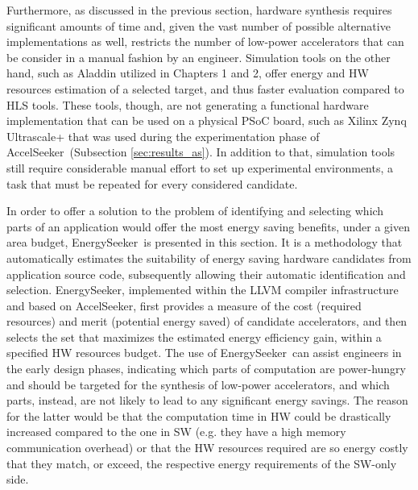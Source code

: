 \documentclass[]{usiinfthesis}
\newcommand{\aseeker}{{AccelSeeker}}
\newcommand{\eseeker}{{EnergySeeker}}
\begin{document}
Furthermore, as discussed in the previous section, hardware
synthesis requires significant amounts of time and, given 
the vast number of possible alternative implementations as well, restricts
the number of low-power accelerators that can be consider in a 
manual fashion by an engineer.
Simulation tools on the other hand, such as Aladdin \cite{ShaoJul14} utilized in Chapters 1 and 2, 
offer energy and HW resources estimation of a selected target, and thus faster evaluation compared to HLS 
tools. These tools,
though, are not generating a functional hardware implementation that can be used on a 
physical PSoC board, such as Xilinx Zynq Ultrascale+ that was used during the experimentation
phase of \aseeker\ (Subsection \ref{sec:results_as}).
In addition to that, simulation tools still require considerable
manual effort to set up experimental environments, a task that must be
repeated for every considered candidate.\par

In order to offer a solution to the problem of identifying and selecting
which parts of an application would offer the most energy saving benefits,
under a given area budget,
\eseeker\ is presented in this section. 
It is a methodology that automatically
estimates the suitability of energy saving hardware candidates from application
source code, subsequently allowing their automatic identification and
selection. \eseeker, implemented within the LLVM
\cite{LattnerMar04} compiler infrastructure and based on \aseeker, first provides a measure
of the cost (required resources) and merit (potential energy saved)
of candidate accelerators, and then selects the set that maximizes 
the estimated energy efficiency gain, within a specified HW resources 
budget. The use of \eseeker\ can assist engineers in the early design phases,
indicating which parts of computation are power-hungry and
should be targeted for the synthesis of low-power accelerators, and which parts,
instead, are not likely to lead to any significant energy savings. The reason for
the latter would be that the computation time in HW could be drastically increased
compared to the one in SW (e.g. they have a high memory communication overhead) or
that the HW resources required are so energy costly that they match, or exceed, the 
respective energy requirements of the SW-only side.
\end{document}
